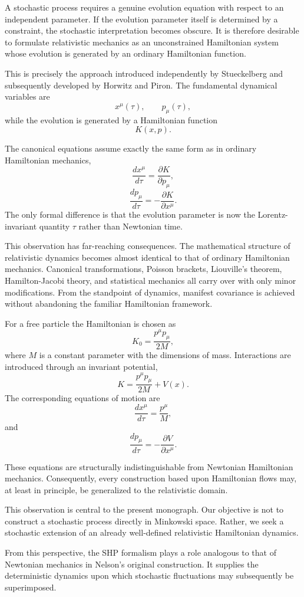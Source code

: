 A stochastic process requires a genuine evolution equation with respect to an
independent parameter. If the evolution parameter itself is determined by a
constraint, the stochastic interpretation becomes obscure. It is therefore
desirable to formulate relativistic mechanics as an unconstrained Hamiltonian
system whose evolution is generated by an ordinary Hamiltonian function.

This is precisely the approach introduced independently by Stueckelberg and
subsequently developed by Horwitz and Piron.
The fundamental dynamical variables are
\[x^\mu(\tau), \qquad p_\mu(\tau),\]
while the evolution is generated by a Hamiltonian function
\[K(x,p).\]

The canonical equations assume exactly the same form as in ordinary
Hamiltonian mechanics,
\[\frac{dx^\mu}{d\tau}=\frac{\partial K}{\partial p_\mu},\]
\[\frac{dp_\mu}{d\tau}=-\frac{\partial K}{\partial x^\mu}.\]
The only formal difference is that the evolution parameter is now the
Lorentz-invariant quantity $\tau$ rather than Newtonian time.

This observation has far-reaching consequences. The mathematical structure of
relativistic dynamics becomes almost identical to that of ordinary Hamiltonian
mechanics. Canonical transformations, Poisson brackets, Liouville's theorem,
Hamilton-Jacobi theory, and statistical mechanics all carry over with only
minor modifications. From the standpoint of dynamics, manifest covariance is
achieved without abandoning the familiar Hamiltonian framework.

For a free particle the Hamiltonian is chosen as
\[K_0=\frac{p^\mu p_\mu}{2M},\]
where $M$ is a constant parameter with the dimensions of mass. Interactions
are introduced through an invariant potential,
\[K=\frac{p^\mu p_\mu}{2M}+V(x).\]
The corresponding equations of motion are
\[\frac{dx^\mu}{d\tau}=\frac{p^\mu}{M},\]
and
\[\frac{dp_\mu}{d\tau}=-\frac{\partial V}{\partial x^\mu}.\]

These equations are structurally indistinguishable from Newtonian Hamiltonian
mechanics. Consequently, every construction based upon Hamiltonian flows may,
at least in principle, be generalized to the relativistic domain.

This observation is central to the present monograph. Our objective is not to
construct a stochastic process directly in Minkowski space. Rather, we seek a
stochastic extension of an already well-defined relativistic Hamiltonian
dynamics.

From this perspective, the SHP formalism plays a role analogous to that of
Newtonian mechanics in Nelson's original construction. It supplies the
deterministic dynamics upon which stochastic fluctuations may subsequently be
superimposed.
